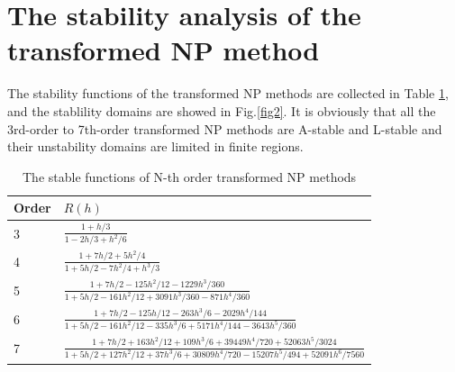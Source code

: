 \documentclass[review]{elsarticle}
\theoremstyle{plain}\newtheorem{definition}{\sc{Definition}}
\theoremstyle{defination}\newtheorem{example}{Example}[section]
\numberwithin{equation}{section}
\numberwithin{table}{section}
\begin{document}
{\section{The stability analysis of the transformed NP method}
The stability functions  of the transformed NP methods are  collected in Table \ref{tab:2}, and the stablility domains are showed in Fig.\ref{fig2}.  It is  obviously that all the 3rd-order to 7th-order transformed NP methods are A-stable and L-stable and their unstability domains are limited in finite regions.



\begin{table}[htbp]
  \small 
  \centering
  \setlength{\belowcaptionskip}{10pt}
  \caption{\small The stable functions of N-th order transformed  NP methods} 
  \begin{tabular}{ll}
	\toprule
Order & $R(h)$\\
\midrule
3 & $\frac{1+h/3}{1-2h/3+h^2/6}$\\
4& $\frac{1+7h/2+5h^2/4}{1+5h/2-7h^2/4+h^3/3}$\\
5 & $\frac{1+7h/2-125h^2/12-1229h^3/360}{1+5h/2-161h^2/12+3091h^3/360-871h^4/360}$\\
6& $\frac{1+7h/2-125h/12-263h^3/6-2029h^4/144}{1+5h/2-161h^2/12-335h^3/6+5171h^4/144-3643h^5/360}$\\
7 & $
  \frac{1+7h/2+163h^2/12+109h^3/6+39449h^4/720+52063h^5/3024}{1+5h/2+127h^2/12+37h^3/6+30809h^4/720-15207h^5/494+52091h^6/7560}$\\
  \bottomrule
\end{tabular}\label{tab:2}
\end{table}


}
\end{document}
